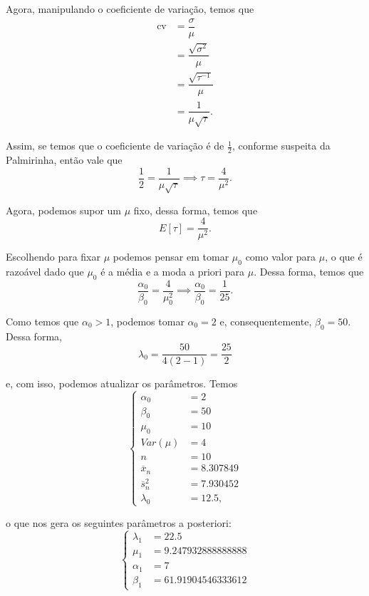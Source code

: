 \documentclass{article}
\begin{document}
Agora, manipulando o coeficiente de variação, temos que
\begin{equation*}
    \begin{split}
        \operatorname{cv} & = \dfrac{\sigma}{\mu} \\
        & = \dfrac{\sqrt{\sigma^2}}{\mu} \\
        & = \dfrac{\sqrt{\tau^{-1}}}{\mu} \\
        & = \dfrac{1}{\mu \sqrt{\tau}}.
    \end{split}
\end{equation*}

Assim, se temos que o coeficiente de variação é de $\frac{1}{2}$, conforme suspeita da Palmirinha, então vale que
\[\dfrac{1}{2} = \dfrac{1}{\mu \sqrt{\tau}} \implies \tau = \dfrac{4}{\mu^2}.\]

Agora, podemos supor um $\mu$ fixo, dessa forma, temos que
\[E[\tau] = \dfrac{4}{\mu^2}.\]

Escolhendo para fixar $\mu$ podemos pensar em tomar $\mu_0$ como valor para $\mu$, o que é razoável dado que $\mu_0$ é a média e a moda a priori para $\mu$. Dessa forma, temos que
\[\dfrac{\alpha_0}{\beta_0} = \dfrac{4}{\mu_0^2} \implies \dfrac{\alpha_0}{\beta_0} = \dfrac{1}{25}.\]

Como temos que $\alpha_0 > 1$, podemos tomar $\alpha_0 = 2$ e, consequentemente, $\beta_0 = 50$. Dessa forma,
\[\lambda_0 = \dfrac{50}{4 \left(2 - 1\right)} = \dfrac{25}{2}\]

\noindent e, com isso, podemos atualizar os parâmetros. Temos
\begin{equation*}
    \left\{
        \begin{array}{ll}
            \alpha_0 & = 2 \\
            \beta_0 & = 50 \\
            \mu_0 & = 10 \\
            Var(\mu) & = 4 \\
            n & = 10 \\
            \overline{x}_n & = 8.307849 \\
            \overline{s}_n^2 & = 7.930452 \\
            \lambda_0 & = 12.5,
        \end{array}
    \right.
\end{equation*}

\noindent o que nos gera os seguintes parâmetros a posteriori:
\begin{equation*}
    \left\{
        \begin{array}{ll}
            \lambda_1 & = 22.5 \\
            \mu_1 & = 9.247932888888888 \\
            \alpha_1 & = 7 \\
            \beta_1 & = 61.91904546333612
        \end{array}
    \right.
\end{equation*}
\end{document}
